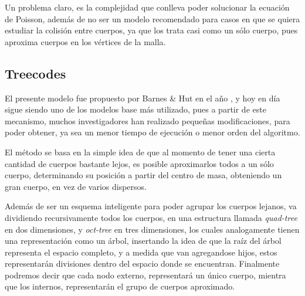 Un problema claro, es la complejidad que conlleva poder solucionar la ecuación de Poisson,
además de no ser un modelo recomendado para casos en que se quiera estudiar la colisión
entre cuerpos, ya que los trata casi como un sólo cuerpo, pues
aproxima cuerpos en los vértices de la malla.



\subsection{Treecodes}

El presente modelo fue propuesto por Barnes \& Hut 
en el año , y hoy en día sigue siendo
uno de los modelos base más utilizado, pues a partir de este
mecanismo, muchos investigadores han realizado pequeñas modificaciones,
para poder obtener, ya sea un menor tiempo de ejecución o menor orden
del algoritmo.

El método se basa en la simple idea de que al momento de tener una cierta
cantidad de cuerpos bastante lejos, es posible aproximarlos todos
a un sólo cuerpo, determinando su posición a partir del centro de masa,
obteniendo un gran cuerpo, en vez de varios dispersos.

Además de ser un esquema inteligente para poder agrupar los cuerpos
lejanos, va dividiendo recursivamente todos los cuerpos,
en una estructura llamada \emph{quad-tree} en dos dimensiones,
y \emph{oct-tree} en tres dimensiones, los cuales analogamente
tienen una representación como un árbol, insertando la idea
de que la raíz del árbol representa el espacio completo,
y a medida que van agregandose hijos, estos representarán
divisiones dentro del espacio donde se encuentran.
Finalmente podremos decir que cada nodo externo,
representará un único cuerpo, mientra que los internos,
representarán el grupo de cuerpos aproximado.

